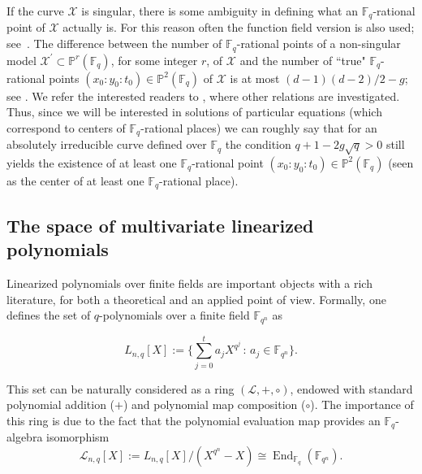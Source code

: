 \documentclass[11pt]{article}
\theoremstyle{definition}
\numberwithin{equation}{section}
\DeclareMathOperator{\End}{End}
\begin{document}
If the curve $\mathcal{X}$ is singular, there is some ambiguity in defining what an $\mathbb{F}_q$-rational point of $\mathcal{X}$ actually is. For this reason often the function field version is also used; see~\cite{Stichtenoth}. The difference between the number of $\mathbb{F}_q$-rational points of a non-singular model $\mathcal{X}^{\prime}\subset \mathbb{P}^r(\mathbb{F}_q)$, for some integer $r$, of $\mathcal{X}$ and the number of  ``true" $\mathbb{F}_q$-rational  points $(x_0:y_0:t_0)\in \mathbb{P}^2(\mathbb{F}_q)$ of $\mathcal{X}$ is at most $(d-1)(d-2)/2-g$; see \cite[Lemma~9.55]{HKT}. We refer the interested readers to \cite[Section 9.6]{HKT}, where other relations are investigated. Thus, since we will be interested in solutions of particular equations (which correspond to centers of $\mathbb{F}_q$-rational places) we can roughly say that for an absolutely irreducible curve  defined over $\mathbb{F}_q$ the condition  $q + 1 - 2g\sqrt{q}>0$ still yields the existence of at least one $\mathbb{F}_q$-rational  point $(x_0:y_0:t_0)\in \mathbb{P}^2(\mathbb{F}_q)$ (seen as the center of at least one  $\mathbb{F}_q$-rational place).  

\subsection{The space of multivariate linearized polynomials}\label{Sec:2.2}
Linearized polynomials over finite fields are important objects with a rich literature, for both a theoretical and an applied point of view. 
Formally, one defines the set of $q$-polynomials over a finite field ${\mathbb F}_{q^n}$ as

$$ L_{n,q}[X]:= \Big\{ \sum_{j=0}^t a_jX^{q^j} \,:\, a_j \in {\mathbb F}_{q^n}\Big\}.$$

This set can be naturally considered as a ring $(\mathcal L, +, \circ)$, endowed with standard polynomial addition ($+$) and  polynomial map composition ($\circ$). The importance of this ring is due to the fact that the polynomial evaluation map provides an $\mathbb{F}_q$-algebra isomorphism
\begin{equation}\label{eq:poly_isomorphism}\mathcal L_{n,q}[X] := L_{n,q}[X]/(X^{q^n}-X)\cong \End_{\mathbb{F}_q}({\mathbb F}_{q^n}).
\end{equation}
\end{document}
